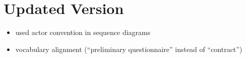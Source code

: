 \chapter{Updated Version}

\begin{itemize}
    \item used actor convention in sequence diagrams
    \item vocabulary alignment (“preliminary questionnaire” instead of “contract”)
\end{itemize}